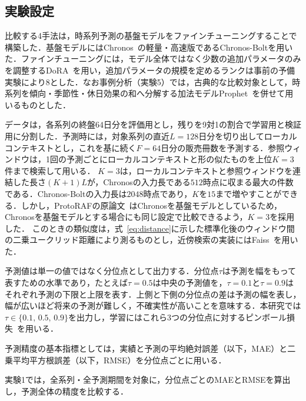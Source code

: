 \documentclass[twocolumn, lastpage]{jarticle}
\newif\ifrevmark
\newcommand{\revA}[1]{\ifrevmark{\color{blue}#1}\else#1\fi}
\begin{document}
\subsection{実験設定}
比較する4手法は，時系列予測の基盤モデルをファインチューニングすることで構築した．基盤モデルにはChronos~\cite{Ansari.2024}の軽量・高速版であるChronos-Boltを用いた．ファインチューニングには，モデル全体ではなく少数の追加パラメータのみを調整するDoRA~\cite{Liu.2024}を用い，追加パラメータの規模を定めるランクは事前の予備実験により$8$とした．なお事例分析（実験5）では，古典的な比較対象として，時系列を傾向・季節性・休日効果の和へ分解する加法モデルProphet~\cite{Taylor.2018}を併せて用いるものとした．

データは，各系列の終盤$64$日分を評価用とし，残りを9対1の割合で学習用と検証用に分割した．予測時には，対象系列の直近$L=128$日分を切り出してローカルコンテキストとし，これを基に続く$F=64$日分の販売冊数を予測する．参照ウィンドウは，1回の予測ごとにローカルコンテキストと形の似たものを上位$K=3$件まで検索して用いる．
\revA{$K=3$は，ローカルコンテキストと参照ウィンドウを連結した長さ$(K+1)L$が，Chronosの入力長である$512$時点に収まる最大の件数である．Chronos-Boltの入力長は$2048$時点であり，$K$を$15$まで増やすことができる．しかし，ProtoRAFの原論文~\cite{Tire.2024}はChronosを基盤モデルとしているため，Chronosを基盤モデルとする場合にも同じ設定で比較できるよう，$K=3$を採用した．}
\revA{このときの類似度は，式~\eqref{eq:distance}に示した標準化後のウィンドウ間の二乗ユークリッド距離により測るものとし，近傍検索の実装にはFaiss~\cite{Johnson.2019}を用いた．}

予測値は単一の値ではなく分位点として出力する．分位点$\tau$は予測を幅をもって表すための水準であり，たとえば$\tau=0.5$は中央の予測値を，$\tau=0.1$と$\tau=0.9$はそれぞれ予測の下限と上限を表す．上側と下側の分位点の差は予測の幅を表し，幅が広いほど将来の予測が難しく，不確実性が高いことを意味する．本研究では$\tau \in \{0.1,\, 0.5,\, 0.9\}$を出力し，学習にはこれら3つの分位点に対するピンボール損失~\cite{Koenker.1978}を用いる．

予測精度の基本指標としては，実績と予測の平均絶対誤差（以下，MAE）と二乗平均平方根誤差（以下，RMSE）を分位点ごとに用いる．

実験1では，全系列・全予測期間を対象に，分位点ごとのMAEとRMSEを算出し，予測全体の精度を比較する．
\end{document}
